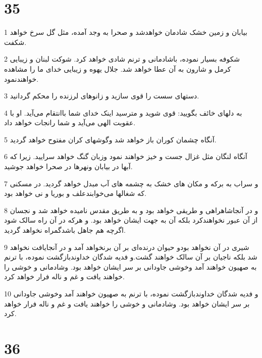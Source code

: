 \chapter{35}

\par 1 بیابان و زمین خشک شادمان خواهدشد و صحرا به وجد آمده، مثل گل سرخ خواهد شکفت.
\par 2 شکوفه بسیار نموده، باشادمانی و ترنم شادی خواهد کرد. شوکت لبنان و زیبایی کرمل و شارون به آن عطا خواهد شد. جلال یهوه و زیبایی خدای ما را مشاهده خواهندنمود.
\par 3 دستهای سست را قوی سازید و زانوهای لرزنده را محکم گردانید.
\par 4 به دلهای خائف بگویید: قوی شوید و مترسید اینک خدای شما باانتقام می‌آید. او با عقوبت الهی می‌آید و شما رانجات خواهد داد.
\par 5 آنگاه چشمان کوران باز خواهد شد وگوشهای کران مفتوح خواهد گردید.
\par 6 آنگاه لنگان مثل غزال جست و خیز خواهند نمود وزبان گنگ خواهد سرایید. زیرا که آبها در بیابان ونهرها در صحرا خواهد جوشید.
\par 7 و سراب به برکه و مکان های خشک به چشمه های آب مبدل خواهد گردید. در مسکنی که شغالها می‌خوابندعلف و بوریا و نی خواهد بود.
\par 8 و در آنجاشاهراهی و طریقی خواهد بود و به طریق مقدس نامیده خواهد شد و نجسان از آن عبور نخواهندکرد بلکه آن به جهت ایشان خواهد بود. و هرکه در آن راه سالک شود اگرچه هم جاهل باشدگمراه نخواهد گردید.
\par 9 شیری در آن نخواهد بودو حیوان درنده‌ای بر آن برنخواهد آمد و در آنجایافت نخواهد شد بلکه ناجیان بر آن سالک خواهند گشت.و فدیه شدگان خداوندبازگشت نموده، با ترنم به صهیون خواهند آمد وخوشی جاودانی بر سر ایشان خواهد بود. وشادمانی و خوشی را خواهند یافت و غم و ناله فرار خواهد کرد.
\par 10 و فدیه شدگان خداوندبازگشت نموده، با ترنم به صهیون خواهند آمد وخوشی جاودانی بر سر ایشان خواهد بود. وشادمانی و خوشی را خواهند یافت و غم و ناله فرار خواهد کرد.
 
\chapter{36}

